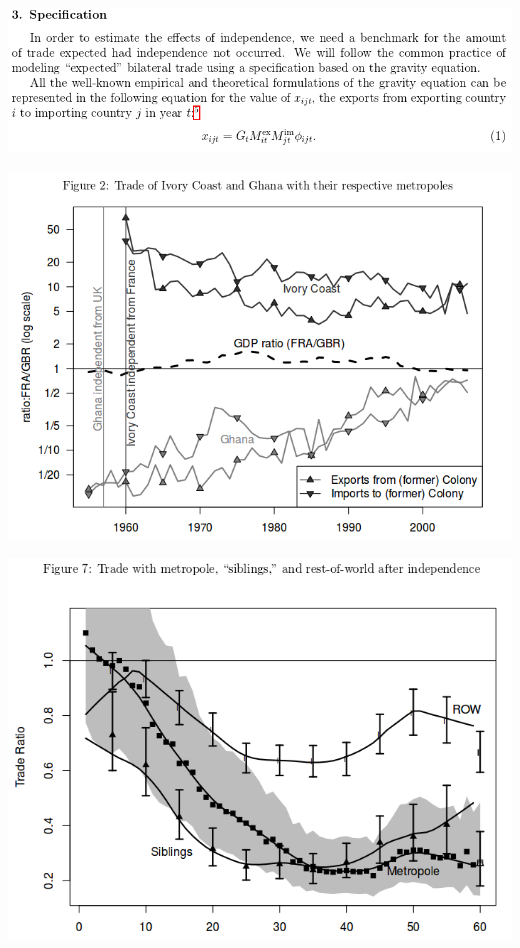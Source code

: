 \documentclass[ignorenonframetext,]{beamer}
\begin{document}
\begin{frame}

    \includegraphics[scale=0.30]{gravity_in_research.png}

\end{frame}

\begin{frame}

    \includegraphics[scale=0.30]{erosion_of_colonial_trade.png}

\end{frame}

\begin{frame}

    \includegraphics[scale=0.30]{siblings_trade.png}

\end{frame}
\end{document}
